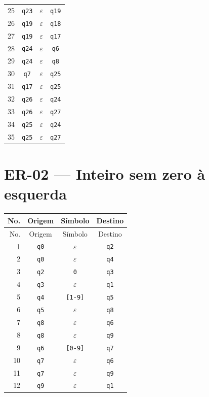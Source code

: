 \documentclass[12pt,a4paper,oneside]{report}
\begin{document}
\begin{longtable}{|r|c|c|c|}
25 & \texttt{q23} & $\varepsilon$ & \texttt{q19} \\
26 & \texttt{q19} & $\varepsilon$ & \texttt{q18} \\
27 & \texttt{q19} & $\varepsilon$ & \texttt{q17} \\
28 & \texttt{q24} & $\varepsilon$ & \texttt{q6} \\
29 & \texttt{q24} & $\varepsilon$ & \texttt{q8} \\
30 & \texttt{q7} & $\varepsilon$ & \texttt{q25} \\
31 & \texttt{q17} & $\varepsilon$ & \texttt{q25} \\
32 & \texttt{q26} & $\varepsilon$ & \texttt{q24} \\
33 & \texttt{q26} & $\varepsilon$ & \texttt{q27} \\
34 & \texttt{q25} & $\varepsilon$ & \texttt{q24} \\
35 & \texttt{q25} & $\varepsilon$ & \texttt{q27} \\
\bottomrule
\end{longtable}
\section{ER-02 --- Inteiro sem zero à esquerda}
\small
\begin{longtable}{|r|c|c|c|}
\toprule
No. & Origem & Símbolo & Destino \\
\midrule
\endfirsthead
\toprule
No. & Origem & Símbolo & Destino \\
\midrule
\endhead
1 & \texttt{q0} & $\varepsilon$ & \texttt{q2} \\
2 & \texttt{q0} & $\varepsilon$ & \texttt{q4} \\
3 & \texttt{q2} & \texttt{0} & \texttt{q3} \\
4 & \texttt{q3} & $\varepsilon$ & \texttt{q1} \\
5 & \texttt{q4} & \texttt{[1-9]} & \texttt{q5} \\
6 & \texttt{q5} & $\varepsilon$ & \texttt{q8} \\
7 & \texttt{q8} & $\varepsilon$ & \texttt{q6} \\
8 & \texttt{q8} & $\varepsilon$ & \texttt{q9} \\
9 & \texttt{q6} & \texttt{[0-9]} & \texttt{q7} \\
10 & \texttt{q7} & $\varepsilon$ & \texttt{q6} \\
11 & \texttt{q7} & $\varepsilon$ & \texttt{q9} \\
12 & \texttt{q9} & $\varepsilon$ & \texttt{q1} \\
\bottomrule
\end{longtable}
\end{document}
